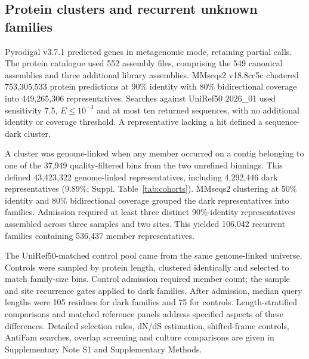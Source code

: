 \documentclass[11pt]{article}
\begin{document}
\subsection*{Protein clusters and recurrent unknown families}

Pyrodigal v3.7.1 \citep{larralde2022pyrodigal,hyatt2010prodigal} predicted genes in metagenomic mode, retaining partial calls. The protein catalogue used 552 assembly files, comprising the 549 canonical assemblies and three additional library assemblies. MMseqs2 v18.8cc5c \citep{steinegger2017mmseqs2,steinegger2018linclust} clustered 753,305,533 protein predictions at 90\% identity with 80\% bidirectional coverage into 449,265,306 representatives. Searches against UniRef50 2026\_01 \citep{suzek2015uniref} used sensitivity 7.5, $E\leq 10^{-3}$ and at most ten returned sequences, with no additional identity or coverage threshold. A representative lacking a hit defined a sequence-dark cluster.

A cluster was genome-linked when any member occurred on a contig belonging to one of the 37,949 quality-filtered bins from the two unrefined binnings. This defined 43,423,322 genome-linked representatives, including 4,292,446 dark representatives (9.89\%; Suppl. Table~\ref{tab:cohorts}). MMseqs2 clustering at 50\% identity and 80\% bidirectional coverage grouped the dark representatives into families. Admission required at least three distinct 90\%-identity representatives assembled across three samples and two sites. This yielded 106,042 recurrent families containing 536,437 member representatives.

The UniRef50-matched control pool came from the same genome-linked universe. Controls were sampled by protein length, clustered identically and selected to match family-size bins. Control admission required member count; the sample and site recurrence gates applied to dark families. After admission, median query lengths were 105 residues for dark families and 75 for controls. Length-stratified comparisons and matched reference panels address specified aspects of these differences. Detailed selection rules, dN/dS estimation, shifted-frame controls, AntiFam searches, overlap screening and culture comparisons are given in Supplementary Note S1 and Supplementary Methods.
\end{document}
